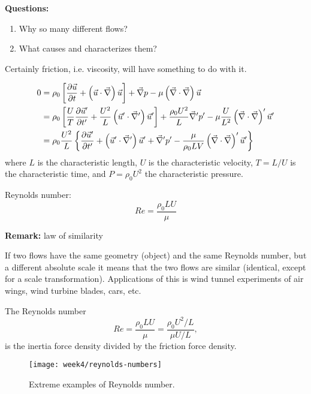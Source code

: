 \textbf{Questions:}
\begin{enumerate}
\item Why so many different flows?
\item What causes and characterizes them?
\end{enumerate}
Certainly friction, i.e. viscosity, will have something to do with it.

\begin{align}
0 &= \rho_0 \left[\frac{\partial \vec{u}}{\partial t}+\left(\vec{u}\cdot\vec{\nabla}\right)\vec{u}\right] + \vec{\nabla}p - \mu \left(\vec{\nabla}\cdot\vec{\nabla}\right) \vec{u} \\
&= \rho_0\left[\frac{U}{T}\frac{\partial \vec{u}'}{\partial t'}+\frac{U^2}{L}\left(\vec{u}'\cdot\vec{\nabla}'\right)\vec{u}'\right] + \frac{\rho_0 U^2}{L}\vec{\nabla}'p'-\mu\frac{U}{L^2}\left(\vec{\nabla}\cdot\vec{\nabla}\right)'\vec{u}' \\
&= \rho_0\frac{U^2}{L} \left\lbrace \frac{\partial \vec{u}'}{\partial t'}+\left(\vec{u}'\cdot\vec{\nabla}'\right)\vec{u}'+\vec{\nabla}'p'-\frac{\mu}{\rho_0 LV} \left(\vec{\nabla}\cdot\vec{\nabla}\right)'\vec{u}' \right\rbrace
\end{align}
where $L$ is the characteristic length, $U$ is the characteristic velocity, $T=L/U$ is the characteristic time, and $P=\rho_0U^2$ the characteristic pressure.

Reynolds number:
\begin{equation}
Re = \frac{\rho_0 L U}{\mu}
\end{equation}

\begin{framed}
\textbf{Remark:} law of similarity

If two flows have the same geometry (object) and the same Reynolds number, but a different absolute scale it means that the two flows are similar (identical, except for a scale transformation). Applications of this is wind tunnel experiments of air wings, wind turbine blades, cars, etc.
\end{framed}

The Reynolds number
\begin{equation}
Re = \frac{\rho_0 L U}{\mu} = \frac{\rho_0 U^2/L}{\mu U/L},
\end{equation}
is the inertia force density divided by the friction force density.

\begin{figure}[p]
    \centering
    \texttt{[image: week4/reynolds-numbers]}\\
    \caption{Extreme examples of Reynolds number.}
    \label{fig:reynolds-numbers}
\end{figure}

